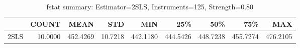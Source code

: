 \begin{table}[ht]
\centering
\caption{fstat summary: Estimator=2SLS, Instruments=125, Strength=0.80}
\begin{tabular}{lrrrrrrrr}
\toprule
 & COUNT & MEAN & STD & MIN & 25\% & 50\% & 75\% & MAX \\
\midrule
2SLS & 10.0000 & 452.4269 & 10.7218 & 442.1180 & 444.5426 & 448.7238 & 455.7274 & 476.2105 \\
\bottomrule
\end{tabular}
\end{table}
